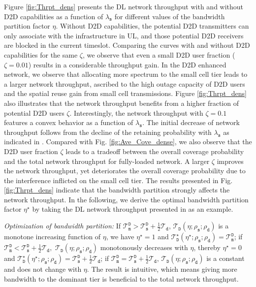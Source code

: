 \documentclass[twocolumn,english]{IEEEtran}
\theoremstyle{plain}
\theoremstyle{definition}
\begin{document}
Figure \ref{fig:Thrpt_dens} presents the DL network throughput with
and without D2D capabilities as a function of $\lambda_{\mathtt{s}}$
for different values of the bandwidth partition factor $\eta$. Without
D2D capabilities, the potential D2D transmitters can only associate
with the infrastructure in UL, and those potential D2D receivers are
blocked in the current timeslot. Comparing the curves with and without
D2D capabilities for the same $\zeta$, we observe that even a small
D2D user fraction ($\zeta=0.01$) results in a considerable throughput
gain. In the D2D enhanced network, we observe that allocating more
spectrum to the small cell tier leads to a larger network throughput,
ascribed to the high outage capacity of D2D users and the spatial
reuse gain from small cell transmissions. Figure \ref{fig:Thrpt_dens}
also illustrates that the network throughput benefits from a higher
fraction of potential D2D users $\zeta$. Interestingly, the network
throughput with $\zeta=0.1$ features a convex behavior as a function
of $\lambda_{\mathtt{s}}$. The initial decrease of network throughput
follows from the decline of the retaining probability with $\lambda_{\mathtt{s}}$
as indicated in . Compared with Fig. \ref{fig:Ave_Cove_dense},
we also observe that the D2D user fraction $\zeta$ leads to a tradeoff
between the overall coverage probability and the total network throughput
for fully-loaded network. A larger $\zeta$ improves the network throughput,
yet deteriorates the overall coverage probability due to the interference
inflicted on the small cell tier. The results presented in Fig. \ref{fig:Thrpt_dens}
indicate that the bandwidth partition strongly affects the network
throughput. In the following, we derive the optimal bandwidth partition
factor $\eta^{\star}$ by taking the DL network throughput presented
in  as an example.

\emph{Optimization of bandwidth partition:} If $\mathcal{T}_{\mathtt{m}}^{\mathtt{D}}>\mathcal{T}_{\mathtt{s}}^{\mathtt{D}}+\frac{1}{2}\mathcal{T}_{\mathtt{d}}$,
$\mathcal{T}_{\mathtt{D}}(\eta;\rho_{\mathtt{s}};\rho_{\mathtt{d}})$
is a monotone increasing function of $\eta$, we have $\eta^{\star}=1$
and $\mathcal{T}_{\mathtt{D}}^{\star}(\eta^{\star};\rho_{\mathtt{s}};\rho_{\mathtt{d}})=\mathcal{T}_{\mathtt{m}}^{\mathtt{D}}$;
if $\mathcal{T}_{\mathtt{m}}^{\mathtt{D}}<\mathcal{T}_{\mathtt{s}}^{\mathtt{D}}+\frac{1}{2}\mathcal{T}_{\mathtt{d}},$
$\mathcal{T}_{\mathtt{D}}(\eta;\rho_{\mathtt{s}};\rho_{\mathtt{d}})$
monotonously decreases with $\eta$, thereby $\eta^{\star}=0$ and
$\mathcal{T}_{\mathtt{D}}^{\star}(\eta^{\star};\rho_{\mathtt{s}};\rho_{\mathtt{d}})=\mathcal{T}_{\mathtt{s}}^{\mathtt{D}}+\frac{1}{2}\mathcal{T}_{\mathtt{d}}$;
if $\mathcal{T}_{\mathtt{m}}^{\mathtt{D}}=\mathcal{T}_{\mathtt{s}}^{\mathtt{D}}+\frac{1}{2}\mathcal{T}_{\mathtt{d}}$,
$\mathcal{T}_{\mathtt{D}}(\eta;\rho_{\mathtt{s}};\rho_{\mathtt{d}})$
is a constant and does not change with $\eta$. The result is intuitive,
which means giving more bandwidth to the dominant tier is beneficial
to the total network throughput.
\end{document}
